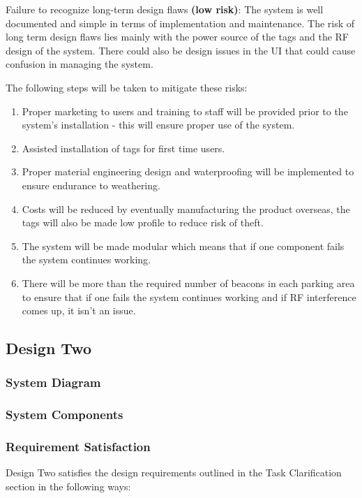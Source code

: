 Failure to recognize long-term design flaws \textbf{(low risk)}: The system is well documented and simple in terms of implementation and maintenance. The risk of long term design flaws lies mainly with the power source of the tags and the RF design of the system. There could also be design issues in the UI that could cause confusion in managing the system.

\newpage
{}
The following steps will be taken to mitigate these risks:

\begin{enumerate}
\item Proper marketing to users and training to staff will be provided prior to the system's installation - this will ensure proper use of the system.
\item Assisted installation of tags for first time users.
\item Proper material engineering design and waterproofing will be implemented to ensure endurance to weathering.
\item Costs will be reduced by eventually manufacturing the product overseas, the tags will also be made low profile to reduce risk of theft.
\item The system will be made modular which means that if one component fails the system continues working. 
\item There will be more than the required number of beacons in each parking area to ensure that if one fails the system continues working and if RF interference comes up, it isn't an issue.
\end{enumerate}

\newpage
\subsection{Design Two}
\subsubsection{System Diagram}
\subsubsection{System Components}
\subsubsection{Requirement Satisfaction}
Design Two satisfies the design requirements outlined in the Task Clarification section in the following ways:

